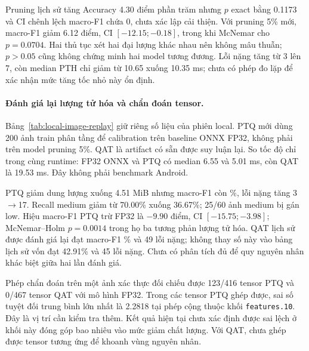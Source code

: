 

Pruning lịch sử tăng Accuracy 4.30 điểm phần trăm nhưng $p$ exact bằng 0.1173 và CI chênh lệch macro-F1 chứa 0, chưa xác lập cải thiện. Với pruning 5\% mới, macro-F1 giảm 6.12 điểm, CI $[-12.15;-0.18]$, trong khi McNemar cho $p=0.0704$. Hai thủ tục xét hai đại lượng khác nhau nên không mâu thuẫn; $p>0.05$ cũng không chứng minh hai model tương đương. Lỗi nặng tăng từ 3 lên 7, còn median PTH chỉ giảm từ 10.65 xuống 10.35 ms; chưa có phép đo lặp để xác nhận mức tăng tốc nhỏ này ổn định.

\paragraph{Đánh giá lại lượng tử hóa và chẩn đoán tensor.} Bảng~\ref{tab:local-image-replay} giữ riêng số liệu của phiên local. PTQ mới dùng 200 ảnh train phân tầng để calibration trên baseline ONNX FP32, không phải trên model pruning 5\%. QAT là artifact có sẵn được suy luận lại. So tốc độ chỉ trong cùng runtime: FP32 ONNX và PTQ có median 6.55 và 5.01 ms, còn QAT là 19.53 ms. Đây không phải benchmark Android.



PTQ giảm dung lượng xuống 4.51 MiB nhưng macro-F1 còn \LocalPTQFOne\%, lỗi nặng tăng 3$\to$17. Recall medium giảm từ 70.00\% xuống 36.67\%; 25/60 ảnh medium bị gán low. Hiệu macro-F1 PTQ trừ FP32 là $-9.90$ điểm, CI $[-15.75;-3.98]$; McNemar--Holm $p=0.0014$ trong họ ba tương phản lượng tử hóa. QAT lịch sử được đánh giá lại đạt macro-F1 \LocalQATFOne\% và 49 lỗi nặng; không thay số này vào bảng lịch sử vốn đạt 42.91\% và 45 lỗi nặng. Chưa có phân tích đủ để quy nguyên nhân khác biệt giữa hai lần đánh giá.

Phép chẩn đoán trên một ảnh xác thực đối chiếu được 123/416 tensor PTQ và 0/467 tensor QAT với mô hình FP32. Trong các tensor PTQ ghép được, sai số tuyệt đối trung bình lớn nhất là 2.2818 tại phép cộng thuộc khối \texttt{features.10}. Đây là vị trí cần kiểm tra thêm. Kết quả hiện tại chưa xác định được sai lệch ở khối này đóng góp bao nhiêu vào mức giảm chất lượng. Với QAT, chưa ghép được tensor tương ứng để khoanh vùng nguyên nhân.
